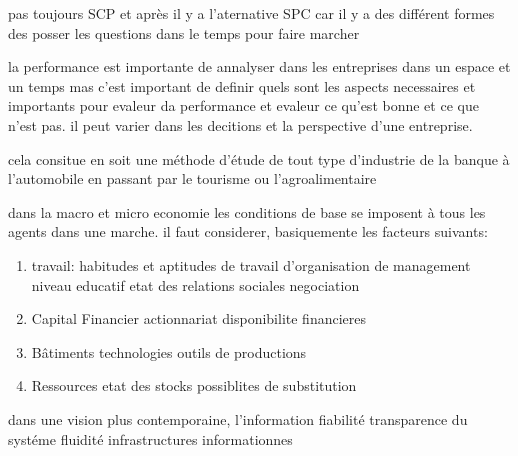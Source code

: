 \documentclass{article}
\begin{document}
pas toujours SCP et après il y a l'aternative SPC car il y a des différent formes des posser les questions dans le temps pour faire marcher 

la performance est importante de annalyser dans les entreprises dans un espace et un temps mas c'est important de definir quels sont les aspects necessaires et importants pour evaleur da performance et evaleur ce qu'est bonne et ce que n'est pas. il peut varier dans les decitions et la perspective d'une entreprise.

cela consitue en soit une méthode d'étude de tout type d'industrie de la banque à l'automobile en passant par le tourisme ou l'agroalimentaire


dans la macro et micro economie 
les conditions de base se imposent à tous les agents dans une marche. il faut considerer, basiquemente les facteurs suivants:
\begin{enumerate}
    \item travail: 
        habitudes et aptitudes de travail d'organisation
        de management
        niveau educatif
        etat des relations sociales
        negociation
    \item Capital Financier
        actionnariat
        disponibilite financieres
    \item Bâtiments
        technologies
        outils de productions
    \item Ressources
        etat des stocks
        possiblites de substitution
\end{enumerate}

dans une vision plus contemporaine, l'information fiabilité transparence du systéme fluidité infrastructures informationnes
\end{document}
